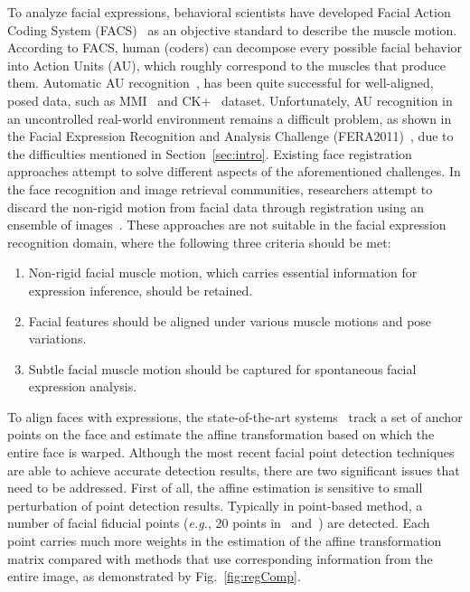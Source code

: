 \documentclass[10pt,journal]{IEEEtran}
\begin{document}
To analyze facial expressions, behavioral scientists have developed Facial Action Coding System (FACS)~\cite{Ekman78} as an objective standard to describe the muscle motion. According to FACS, human (coders) can decompose every possible facial behavior into Action Units (AU), which roughly correspond to the muscles that produce them. Automatic AU recognition~\cite{Zhao_PAMI07}\cite{Valstar_SMCB12}, has been quite successful for well-aligned, posed data, such as MMI~\cite{Pantic_ICME05} and CK+~\cite{Kanade_FG00} dataset. Unfortunately, AU recognition in an uncontrolled real-world environment remains a difficult problem, as shown in the Facial Expression Recognition and Analysis Challenge (FERA2011)~\cite{Valstar_FERA11}, due to the difficulties mentioned in Section~\ref{sec:intro}. Existing face registration approaches attempt to solve different aspects of the aforementioned challenges. In the face recognition and image retrieval communities, researchers attempt to discard the non-rigid motion from facial data through registration using an ensemble of images~\cite{LearnedMiller_PAMI06}\cite{Huang_ICCV07}\cite{Peng_PAMI12}. These approaches are not suitable in the facial expression recognition domain, where the following three criteria should be met:
\begin{enumerate}
\item Non-rigid facial muscle motion, which carries essential information for expression inference, should be retained. 
\item Facial features should be aligned under various muscle motions and pose variations. 
\item Subtle facial muscle motion should be captured for spontaneous facial expression analysis.
\end{enumerate}

To align faces with expressions, the state-of-the-art systems~\cite{Valstar_SMCB12}\cite{Littlewort_CERT_FG2011} track a set of anchor points on the face and estimate the affine transformation based on which the entire face is warped. Although the most recent facial point detection techniques~\cite{Martinez_PAMI13}\cite{Xiong13}\cite{Zhu_CVPR12} are able to achieve accurate detection results, there are two significant issues that need to be addressed. First of all, the affine estimation is sensitive to small perturbation of point detection results. Typically in point-based method, a number of facial fiducial points (\textit{e.g.}, 20 points in~\cite{Valstar_SMCB12} and~\cite{Martinez_PAMI13}) are detected. Each point carries much more weights in the estimation of the affine transformation matrix compared with methods that use corresponding information from the entire image, as demonstrated by Fig.~\ref{fig:regComp}.
\end{document}
